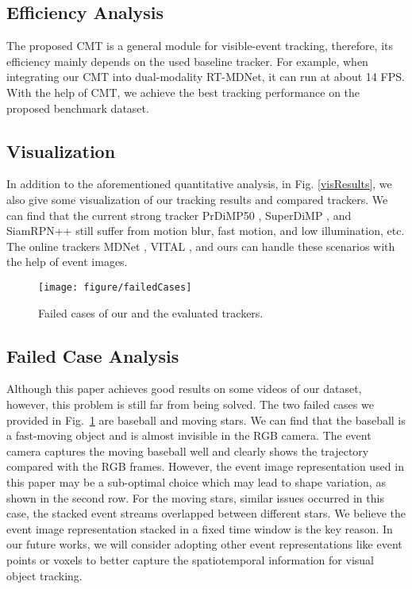 \documentclass[journal]{IEEEtran}
\begin{document}
\subsection{Efficiency Analysis} 
The proposed CMT is a general module for visible-event tracking, therefore, its efficiency mainly depends on the used baseline tracker. For example, when integrating our CMT into dual-modality RT-MDNet, it can run at about 14 FPS. With the help of CMT, we achieve the best tracking performance on the proposed benchmark dataset. 


 

\subsection{Visualization} 
In addition to the aforementioned quantitative analysis, in Fig. \ref{visResults}, we also give some visualization of our tracking results and compared trackers. We can find that the current strong tracker PrDiMP50 \cite{danelljan2020PRDiMP}, SuperDiMP \cite{bhat2019DiMP}, and SiamRPN++ \cite{li2018siamrpn++} still suffer from motion blur, fast motion, and low illumination, etc. The online trackers MDNet \cite{Nam2015Learning}, VITAL \cite{song2018vital}, and ours can handle these scenarios with the help of event images. 


\begin{figure} 
\center
\texttt{[image: figure/failedCases]}
\caption{Failed cases of our and the evaluated trackers.}   
\label{failedCases}
\end{figure} 


\subsection{Failed Case Analysis}   
Although this paper achieves good results on some videos of our dataset, however, this problem is still far from being solved. The two failed cases we provided in Fig.~\ref{failedCases} are baseball and moving stars. We can find that the baseball is a fast-moving object and is almost invisible in the RGB camera. The event camera captures the moving baseball well and clearly shows the trajectory compared with the RGB frames. However, the event image representation used in this paper may be a sub-optimal choice which may lead to shape variation, as shown in the second row. For the moving stars, similar issues occurred in this case, the stacked event streams overlapped between different stars. We believe the event image representation stacked in a fixed time window is the key reason. In our future works, we will consider adopting other event representations like event points or voxels to better capture the spatiotemporal information for visual object tracking.
\end{document}
